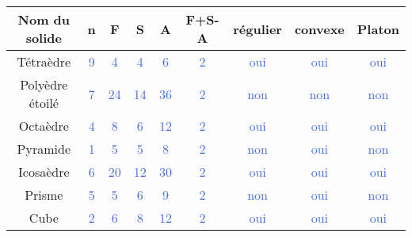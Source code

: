 \pagebreak



    \begin{center}    
        {
        \begin{tabular}{|C{2.5}|*{4}{C{0.9}|}*{4}{C{1.5}|}}
            \hline
            Nom du solide & n & F & S & A & \!\!F+S-A & régulier & convexe & Platon \\
            \hline
            Tétraèdre & \textcolor{RoyalBlue}{9} & \textcolor{RoyalBlue}{4} & \textcolor{RoyalBlue}{4} & \textcolor{RoyalBlue}{6} & \textcolor{RoyalBlue}{2} & \textcolor{RoyalBlue}{oui} & \textcolor{RoyalBlue}{oui} & \textcolor{RoyalBlue}{oui} \\
            \hline
            Polyèdre étoilé & \textcolor{RoyalBlue}{7} & \textcolor{RoyalBlue}{24} & \textcolor{RoyalBlue}{14} & \textcolor{RoyalBlue}{36} & \textcolor{RoyalBlue}{2} & \textcolor{RoyalBlue}{non} & \textcolor{RoyalBlue}{non} & \textcolor{RoyalBlue}{non} \\
            \hline
            Octaèdre & \textcolor{RoyalBlue}{4} & \textcolor{RoyalBlue}{8} & \textcolor{RoyalBlue}{6} & \textcolor{RoyalBlue}{12} & \textcolor{RoyalBlue}{2} & \textcolor{RoyalBlue}{oui} & \textcolor{RoyalBlue}{oui} & \textcolor{RoyalBlue}{oui} \\
            \hline
            Pyramide & \textcolor{RoyalBlue}{1} & \textcolor{RoyalBlue}{5} & \textcolor{RoyalBlue}{5} & \textcolor{RoyalBlue}{8} & \textcolor{RoyalBlue}{2} & \textcolor{RoyalBlue}{non} & \textcolor{RoyalBlue}{oui} & \textcolor{RoyalBlue}{non} \\
            \hline
            Icosaèdre & \textcolor{RoyalBlue}{6} & \textcolor{RoyalBlue}{20} & \textcolor{RoyalBlue}{12} & \textcolor{RoyalBlue}{30} & \textcolor{RoyalBlue}{2} & \textcolor{RoyalBlue}{oui} & \textcolor{RoyalBlue}{oui} & \textcolor{RoyalBlue}{oui} \\
            \hline
            Prisme & \textcolor{RoyalBlue}{5} & \textcolor{RoyalBlue}{5} & \textcolor{RoyalBlue}{6} & \textcolor{RoyalBlue}{9} & \textcolor{RoyalBlue}{2} & \textcolor{RoyalBlue}{non} & \textcolor{RoyalBlue}{oui} & \textcolor{RoyalBlue}{non} \\
            \hline
            Cube & \textcolor{RoyalBlue}{2} & \textcolor{RoyalBlue}{6} & \textcolor{RoyalBlue}{8} & \textcolor{RoyalBlue}{12} & \textcolor{RoyalBlue}{2} & \textcolor{RoyalBlue}{oui} & \textcolor{RoyalBlue}{oui} & \textcolor{RoyalBlue}{oui} \\

\end{tabular}}
\end{center}
